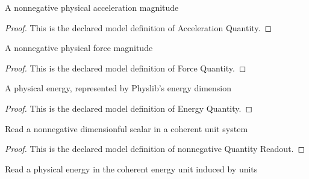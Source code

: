 \begin{definition}
  \label{def:physics:phyx-mini-0812:phyxminiproblems-problemphyxmini0812-accelerationquantity}
  A nonnegative physical acceleration magnitude
\end{definition}
\begin{proof}
  This is the declared model definition of Acceleration Quantity.
\end{proof}
\begin{definition}
  \label{def:physics:phyx-mini-0812:phyxminiproblems-problemphyxmini0812-forcequantity}
  A nonnegative physical force magnitude
\end{definition}
\begin{proof}
  This is the declared model definition of Force Quantity.
\end{proof}
\begin{definition}
  \label{def:physics:phyx-mini-0812:phyxminiproblems-problemphyxmini0812-energyquantity}
  A physical energy, represented by Physlib's energy dimension
\end{definition}
\begin{proof}
  This is the declared model definition of Energy Quantity.
\end{proof}
\begin{definition}
  \label{def:physics:phyx-mini-0812:phyxminiproblems-problemphyxmini0812-nonnegativequantityreadout}
  Read a nonnegative dimensionful scalar in a coherent unit system
\end{definition}
\begin{proof}
  This is the declared model definition of nonnegative Quantity Readout.
\end{proof}
\begin{definition}
  \label{def:physics:phyx-mini-0812:phyxminiproblems-problemphyxmini0812-energyreadout}
  Read a physical energy in the coherent energy unit induced by units
\end{definition}
